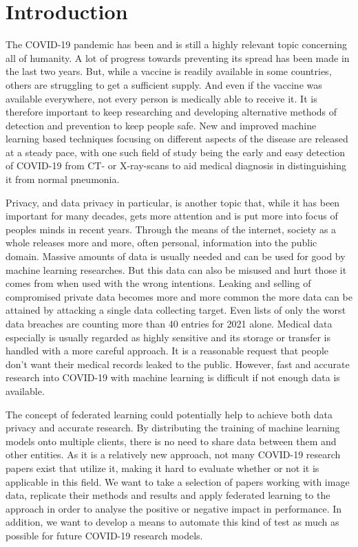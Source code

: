 \section{Introduction}

The COVID-19 pandemic has been and is still a highly relevant topic concerning all of humanity. A lot of progress towards preventing its spread has been made in the last two years. But, while a vaccine is readily available in some countries, others are struggling to get a sufficient supply. And even if the vaccine was available everywhere, not every person is medically able to receive it. It is therefore important to keep researching and developing alternative methods of detection and prevention to keep people safe. New and improved machine learning based techniques focusing on different aspects of the disease are released at a steady pace, with one such field of study being the early and easy detection of COVID-19 from CT- or X-ray-scans to aid medical diagnosis in distinguishing it from normal pneumonia.

Privacy, and data privacy in particular, is another topic that, while it has been important for many decades, gets more attention and is put more into focus of peoples minds in recent years. Through the means of the internet, society as a whole releases more and more, often personal, information into the public domain. Massive amounts of data is usually needed and can be used for good by machine learning researches. But this data can also be misused and hurt those it comes from when used with the wrong intentions. Leaking and selling of compromised private data becomes more and more common the more data can be attained by attacking a single data collecting target. Even lists of only the worst data breaches are counting more than 40 entries for 2021 alone.\cite{data_breaches}
Medical data especially is usually regarded as highly sensitive and its storage or transfer is handled with a more careful approach. It is a reasonable request that people don't want their medical records leaked to the public. However, fast and accurate research into COVID-19 with machine learning is difficult if not enough data is available. 

The concept of federated learning could potentially help to achieve both data privacy and accurate research. By distributing the training of machine learning models onto multiple clients, there is no need to share data between them and other entities. As it is a relatively new approach, not many COVID-19 research papers exist that utilize it, making it hard to evaluate whether or not it is applicable in this field. We want to take a selection of papers working with image data, replicate their methods and results and apply federated learning to the approach in order to analyse the positive or negative impact in performance. In addition, we want to develop a means to automate this kind of test as much as possible for future COVID-19 research models. 

